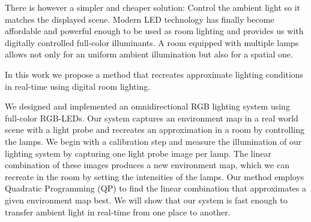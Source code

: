 There is however a simpler and cheaper solution: Control the ambient light so it matches the displayed scene.
Modern LED technology has finally become affordable and powerful enough to be used as room lighting and provides us with digitally controlled full-color illuminants.
A room equipped with multiple lamps allows not only for an uniform ambient illumination but also for a spatial one.

In this work we propose a method that recreates approximate lighting conditions in real-time using digital room lighting. 

We designed and implemented an omnidirectional RGB lighting system using full-color RGB-LEDs.
Our system captures an environment map in a real world scene with a light probe and recreates an approximation in a room by controlling the lamps.
We begin with a calibration step and measure the illumination of our lighting system by capturing one light probe image per lamp.
The linear combination of these images produces a new environment map, which we can recreate in the room by setting the intensities of the lamps.
Our method employs Quadratic Programming (QP) to find the linear combination that approximates a given environment map best. 
We will show that our system is fast enough to transfer ambient light in real-time from one place to another.

